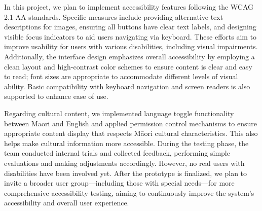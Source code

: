 ﻿%


In this project, we plan to implement accessibility features following the WCAG 2.1 AA standards. Specific measures include providing alternative text descriptions for images, ensuring all buttons have clear text labels, and designing visible focus indicators to aid users navigating via keyboard. These efforts aim to improve usability for users with various disabilities, including visual impairments. Additionally, the interface design emphasizes overall accessibility by employing a clean layout and high-contrast color schemes to ensure content is clear and easy to read; font sizes are appropriate to accommodate different levels of visual ability. Basic compatibility with keyboard navigation and screen readers is also supported to enhance ease of use.

Regarding cultural content, we implemented language toggle functionality between Māori and English and applied permission control mechanisms to ensure appropriate content display that respects Māori cultural characteristics. This also helps make cultural information more accessible. During the testing phase, the team conducted internal trials and collected feedback, performing simple evaluations and making adjustments accordingly. However, no real users with disabilities have been involved yet. After the prototype is finalized, we plan to invite a broader user group—including those with special needs—for more comprehensive accessibility testing, aiming to continuously improve the system’s accessibility and overall user experience.